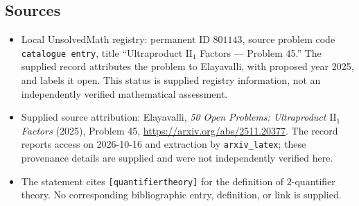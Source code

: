 \documentclass[11pt]{article}
\begin{document}
\subsection{Sources}
\begin{itemize}
\item Local UnsolvedMath registry: permanent ID \(801143\), source problem code \texttt{catalogue entry}, title ``Ultraproduct \(\mathrm{II}_1\) Factors --- Problem 45.'' The supplied record attributes the problem to Elayavalli, with proposed year 2025, and labels it open. This status is supplied registry information, not an independently verified mathematical assessment.
\item Supplied source attribution: Elayavalli, \emph{50 Open Problems: Ultraproduct \(\mathrm{II}_1\) Factors} (2025), Problem 45, \url{https://arxiv.org/abs/2511.20377}. The record reports access on 2026-10-16 and extraction by \texttt{arxiv\_latex}; these provenance details are supplied and were not independently verified here.
\item The statement cites \texttt{[quantifiertheory]} for the definition of \(2\)-quantifier theory. No corresponding bibliographic entry, definition, or link is supplied.
\end{itemize}
\end{document}

